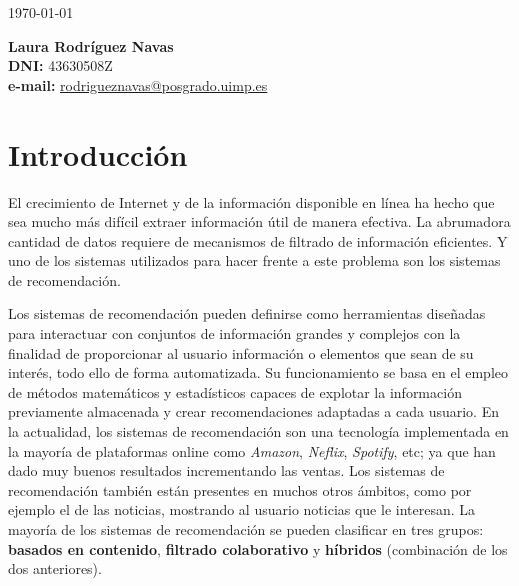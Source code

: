 \documentclass{uimppracticas}
\begin{document}
	
\frontmatter


\begin{center}
	\large \today
\end{center}

\vspace{40mm}

\begin{flushright}
	{\bf Laura Rodríguez Navas}\\
	\textbf{DNI:} 43630508Z\\
	\textbf{e-mail:} \href{rodrigueznavas@posgrado.uimp.es}{rodrigueznavas@posgrado.uimp.es}
\end{flushright}

\newpage

\tableofcontents

\newpage

\mainmatter

\setlength\parskip{2.5ex}

\section{Introducción}\label{introducción}

El crecimiento de Internet y de la información disponible en línea ha hecho que sea mucho más difícil extraer información útil de manera efectiva. La abrumadora cantidad de datos requiere de mecanismos de filtrado de información eficientes. Y uno de los sistemas utilizados para hacer frente a este problema son los sistemas de recomendación.

Los sistemas de recomendación pueden definirse como herramientas diseñadas para interactuar con conjuntos de información grandes y complejos con la finalidad de proporcionar al usuario información o elementos que sean de su interés, todo ello de forma automatizada. Su funcionamiento se basa en el empleo de métodos matemáticos y estadísticos capaces de explotar la información previamente almacenada y crear recomendaciones adaptadas a cada usuario. En la actualidad, los sistemas de recomendación son una tecnología implementada en la mayoría de plataformas online como \textit{Amazon}, \textit{Neflix}, \textit{Spotify}, etc; ya que han dado muy buenos resultados incrementando las ventas. Los sistemas de recomendación también están presentes en muchos otros ámbitos, como por ejemplo el de las noticias, mostrando al usuario noticias que le interesan. La mayoría de los sistemas de recomendación se pueden clasificar en tres grupos: \textbf{basados en contenido}, \textbf{filtrado colaborativo} y \textbf{híbridos} (combinación de los dos anteriores).
\end{document}
